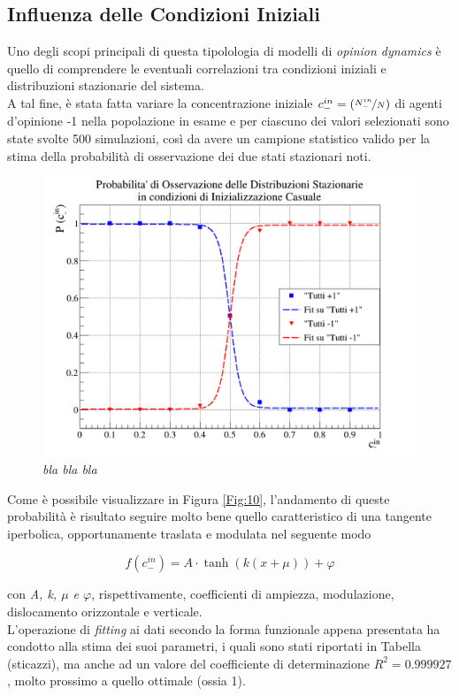 \documentclass{article}
\begin{document}
\subsection{Influenza delle Condizioni Iniziali}
\label{Sec:4.4}

Uno degli scopi principali di questa tipolologia di modelli di \textit{opinion dynamics} è quello di comprendere le eventuali correlazioni tra condizioni iniziali e distribuzioni stazionarie del sistema.
\\ A tal fine, è stata fatta variare la concentrazione iniziale $c_{-}^{in} = (\nicefrac{N_{-}^{in}}{N})$ di agenti d'opinione -1 nella popolazione in esame e per ciascuno dei valori selezionati sono state svolte 500 simulazioni, così da avere un campione statistico valido per la stima della probabilità di osservazione dei due stati stazionari noti.

\begin{figure}[h]
\centering
\includegraphics[width = \linewidth]{random_prob_graph.png}
\caption{\textit{bla bla bla}}
\label{Fig:11}
\end{figure}

Come è possibile visualizzare in Figura \ref{Fig:10}, l'andamento di queste probabilità è risultato seguire molto bene quello caratteristico di una tangente iperbolica, opportunamente traslata e modulata nel seguente modo

\begin{equation}
f(c_{-}^{in}) = A \cdot \tanh(k(x+\mu))+\varphi
\end{equation}

con \textit{A, k, $\mu$ e $\varphi$}, rispettivamente, coefficienti di ampiezza, modulazione, dislocamento orizzontale e verticale.
\\ L'operazione di \textit{fitting} ai dati secondo la forma funzionale appena presentata ha condotto alla stima dei suoi parametri, i quali sono stati riportati in Tabella (sticazzi), ma anche ad un valore del coefficiente di determinazione $R^2 = 0.999927$, molto prossimo a quello ottimale (ossia 1).
\end{document}
